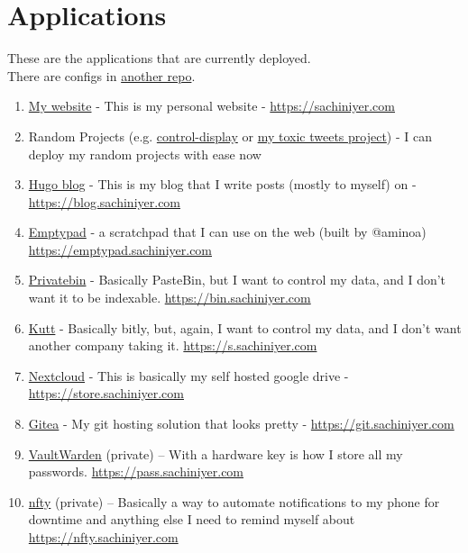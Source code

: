 \documentclass[12pt]{article}
\begin{document}
\section{Applications}
These are the applications that are currently deployed.\\
There are configs in \href{https://github.com/sachiniyer/k3s-configs}{another repo}.
\begin{enumerate}
  \item \href{https://sachiniyer.com}{My website} - This is my personal website - \href{https://sachiniyer.com}{https://sachiniyer.com}
  \item Random Projects (e.g. \href{https://school-demo.sachiniyer.com}{control-display} or \href{https://ai.sachiniyer.com}{my toxic tweets project}) - I can deploy my random projects with ease now
  \item \href{https://gohugo.io/}{Hugo blog} - This is my blog that I write posts (mostly to myself) on - \href{https://blog.sachiniyer.com}{https://blog.sachiniyer.com}
  \item \href{https://github.com/aminoa/emptypad}{Emptypad} - a scratchpad that I can use on the web (built by @aminoa) \href{https://emptypad.sachiniyer.com}{https://emptypad.sachiniyer.com}
  \item \href{https://privatebin.info/}{Privatebin} - Basically PasteBin, but I want to control my data, and I don't want it to be indexable. \href{https://bin.sachiniyer.com}{https://bin.sachiniyer.com}
  \item \href{https://kutt.it/}{Kutt} - Basically bitly, but, again, I want to control my data, and I don't want another company taking it. \href{https://s.sachiniyer.com}{https://s.sachiniyer.com}
  \item \href{https://nextcloud.com}{Nextcloud} - This is basically my self hosted google drive - \href{https://store.sachiniyer.com}{https://store.sachiniyer.com}
  \item \href{https://gitea.io}{Gitea} - My git hosting solution that looks pretty - \href{https://git.sachiniyer.com}{https://git.sachiniyer.com}
  \item \href{https://github.com/dani-garcia/vaultwarden}{VaultWarden} (private) -- With a hardware key is how I store all my passwords. \href{https://pass.sachiniyer.com}{https://pass.sachiniyer.com}
  \item \href{https://docs.ntfy.sh/}{nfty} (private) -- Basically a way to automate notifications to my phone for downtime and anything else I need to remind myself about \href{https://nfty.sachiniyer.com}{https://nfty.sachiniyer.com}

\end{enumerate}
\end{document}

